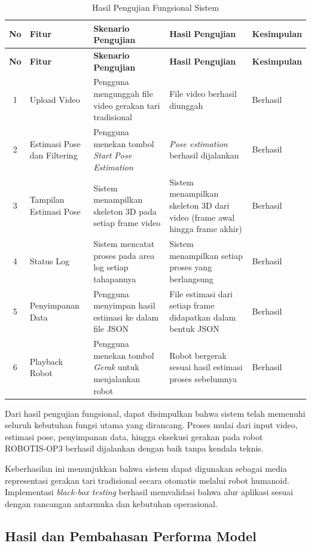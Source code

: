 \begin{longtable}{|c|p{2.5cm}|p{3cm}|p{3cm}|p{2.5cm}|}
\caption{Hasil Pengujian Fungsional Sistem} \label{tab:hasil_pengujian_fungsional} \\
\hline
\textbf{No} & \textbf{Fitur} & \textbf{Skenario Pengujian} & \textbf{Hasil Pengujian} & \textbf{Kesimpulan} \\ \hline
\endfirsthead
\hline
\textbf{No} & \textbf{Fitur} & \textbf{Skenario Pengujian} & \textbf{Hasil Pengujian} & \textbf{Kesimpulan} \\ \hline
\endhead

1 & Upload Video & Pengguna mengunggah file video gerakan tari tradisional & File video berhasil diunggah & Berhasil \\ \hline
2 & Estimasi Pose dan Filtering & Pengguna menekan tombol \textit{Start Pose Estimation} & \textit{Pose estimation} berhasil dijalankan & Berhasil \\ \hline
3 & Tampilan Estimasi Pose & Sistem menampilkan skeleton 3D pada setiap frame video & Sistem menampilkan skeleton 3D dari video (frame awal hingga frame akhir) & Berhasil \\ \hline
4 & Status Log & Sistem mencatat proses pada area log setiap tahapannya & Sistem menampilkan setiap proses yang berlangsung & Berhasil \\ \hline
5 & Penyimpanan Data & Pengguna menyimpan hasil estimasi ke dalam file JSON & File estimasi dari setiap frame didapatkan dalam bentuk JSON & Berhasil \\ \hline
6 & Playback Robot & Pengguna menekan tombol \textit{Gerak} untuk menjalankan robot & Robot bergerak sesuai hasil estimasi proses sebelumnya & Berhasil \\ \hline

\end{longtable}
Dari hasil pengujian fungsional, dapat disimpulkan bahwa sistem telah memenuhi seluruh kebutuhan fungsi utama yang dirancang. Proses mulai dari input video, estimasi pose, penyimpanan data, hingga eksekusi gerakan pada robot ROBOTIS-OP3 berhasil dijalankan dengan baik tanpa kendala teknis.

Keberhasilan ini menunjukkan bahwa sistem dapat digunakan sebagai media representasi gerakan tari tradisional secara otomatis melalui robot humanoid. Implementasi \textit{black-box testing} berhasil memvalidasi bahwa alur aplikasi sesuai dengan rancangan antarmuka dan kebutuhan operasional.

\subsection{Hasil dan Pembahasan Performa Model}

